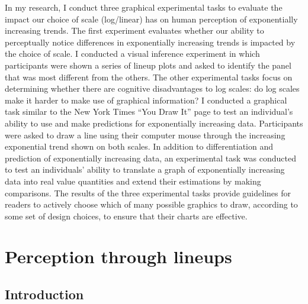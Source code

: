 \documentclass[print]{nuthesis}
\begin{document}
In my research, I conduct three graphical experimental tasks to evaluate the impact our choice of scale (log/linear) has on human perception of exponentially increasing trends.
The first experiment evaluates whether our ability to perceptually notice differences in exponentially increasing trends is impacted by the choice of scale. I conducted a visual inference experiment in which participants were shown a series of lineup plots and asked to identify the panel that was most different from the others.
The other experimental tasks focus on determining whether there are cognitive disadvantages to log scales: do log scales make it harder to make use of graphical information?
I conducted a graphical task similar to the New York Times ``You Draw It'' page to test an individual's ability to use and make predictions for exponentially increasing data.
Participants were asked to draw a line using their computer mouse through the increasing exponential trend shown on both scales.
In addition to differentiation and prediction of exponentially increasing data, an experimental task was conducted to test an individuals' ability to translate a graph of exponentially increasing data into real value quantities and extend their estimations by making comparisons.
The results of the three experimental tasks provide guidelines for readers to actively choose which of many possible graphics to draw, according to some set of design choices, to ensure that their charts are effective.


\hypertarget{lineups}{%
\chapter{Perception through lineups}\label{lineups}}

\hypertarget{introduction}{%
\section{Introduction}\label{introduction}}
\end{document}
